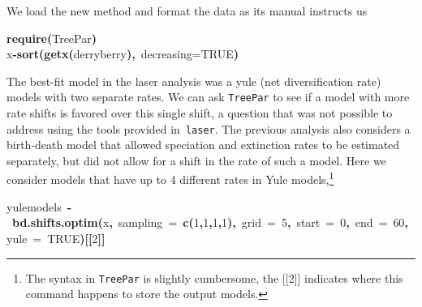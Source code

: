 \documentclass[authoryear, preprint]{elsarticle}
\makeatletter
\newcommand{\hlnumber}[1]{\textcolor[rgb]{0,0,0}{#1}}%
\newcommand{\hlfunctioncall}[1]{\textcolor[rgb]{.5,0,.33}{\textbf{#1}}}%
\newcommand{\hlkeyword}[1]{\textbf{#1}}%
\newcommand{\hlargument}[1]{\textcolor[rgb]{.69,.25,.02}{#1}}%
\newcommand{\hlassignement}[1]{\textbf{#1}}%
\newcommand{\hlsymbol}[1]{#1}%
\newcommand{\hlstd}[1]{\textcolor[rgb]{0,0,0}{#1}}%
\newenvironment{kframe}{%
 \def\FrameCommand##1{\hskip\@totalleftmargin \hskip-\fboxsep
 \colorbox{shadecolor}{##1}\hskip-\fboxsep
     \hskip-\linewidth \hskip-\@totalleftmargin \hskip\columnwidth}%
 \MakeFramed {\advance\hsize-\width
   \@totalleftmargin\z@ \linewidth\hsize
   \@setminipage}}%
 {\par\unskip\endMakeFramed}
\newenvironment{knitrout}{}{} %
\makeatother
\begin{document}
\begin{knitrout}
\color{fgcolor}
\end{knitrout}


We load the new method and format the data as its manual instructs us
\begin{knitrout}
\color{fgcolor}\begin{kframe}
\begin{flushleft}
\ttfamily\noindent
\hlfunctioncall{require}\hlkeyword{(}\hlsymbol{TreePar}\hlkeyword{)}\hspace*{\fill}\\
\hlstd{}\hlsymbol{x}\hlassignement{\usebox{\hlnormalsizeboxlessthan}-}\hlfunctioncall{sort}\hlkeyword{(}\hlfunctioncall{getx}\hlkeyword{(}\hlsymbol{derryberry}\hlkeyword{)}\hlkeyword{,}{\ }\hlargument{decreasing}\hlargument{=}\hlnumber{TRUE}\hlkeyword{)}\mbox{}
\normalfont
\end{flushleft}
\end{kframe}
\end{knitrout}


The best-fit model in the laser analysis was a yule (net diversification rate) models with two separate rates.  
We can ask \texttt{TreePar} to see if a model with more rate shifts is favored over this single shift,
a question that was not possible to address using the tools provided in~\texttt{laser}. 
The previous analysis also considers a birth-death model that allowed speciation and extinction rates to 
be estimated separately, but did not allow for a shift in the rate of such a model.  
Here we consider models that have up to 4 different rates in Yule models,\footnote{The syntax in \texttt{TreePar} is slightly cumbersome, the [[2]] indicates where this command happens to store the output models.}


\begin{knitrout}
\color{fgcolor}\begin{kframe}
\begin{flushleft}
\ttfamily\noindent
\hlsymbol{yule\usebox{\hlnormalsizeboxunderscore}models}{\ }\hlassignement{\usebox{\hlnormalsizeboxlessthan}-}{\ }\hlfunctioncall{bd.shifts.optim}\hlkeyword{(}\hlsymbol{x}\hlkeyword{,}{\ }\hlargument{sampling}{\ }\hlargument{=}{\ }\hlfunctioncall{c}\hlkeyword{(}\hlnumber{1}\hlkeyword{,}\hlnumber{1}\hlkeyword{,}\hlnumber{1}\hlkeyword{,}\hlnumber{1}\hlkeyword{)}\hlkeyword{,}{\ }\hlargument{grid}{\ }\hlargument{=}{\ }\hlnumber{5}\hlkeyword{,}{\ }\hlargument{start}{\ }\hlargument{=}{\ }\hlnumber{0}\hlkeyword{,}{\ }\hlargument{end}{\ }\hlargument{=}{\ }\hlnumber{60}\hlkeyword{,}{\ }\hlargument{yule}{\ }\hlargument{=}{\ }\hlnumber{TRUE}\hlkeyword{)}\hlkeyword{[[}\hlnumber{2}\hlkeyword{]}\hlkeyword{]}\mbox{}
\normalfont
\end{flushleft}
\end{kframe}
\end{knitrout}
\end{document}
